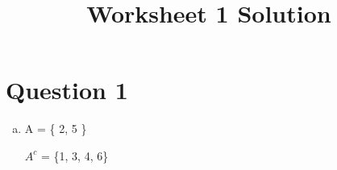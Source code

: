 \documentclass[12pt]{article}
\begin{document}
\title{Worksheet 1 Solution}
\maketitle

\section*{Question 1}

\begin{enumerate}[a.]
    \item A = \{ 2, 5 \}

        $A^c$ = \{1, 3, 4, 6\}
\end{enumerate}
\end{document}
